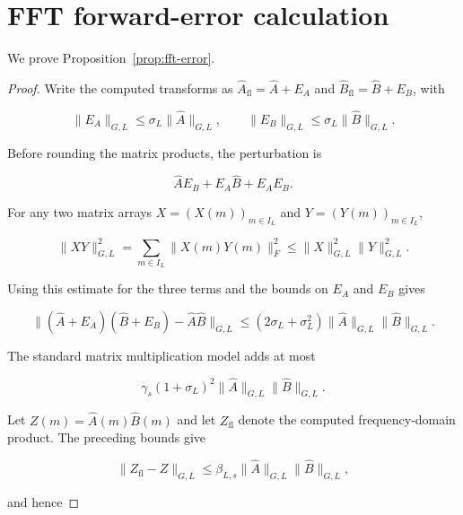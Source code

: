 \documentclass[3p,12pt,authoryear]{elsarticle}
\theoremstyle{definition}
\theoremstyle{remark}
\newcommand{\fl}{\mathrm{fl}}
\begin{document}
\section{FFT forward-error calculation}\label{app:fft-error}

We prove Proposition~\ref{prop:fft-error}.

\begin{proof}
Write the computed transforms as $\widehat A_{\fl}=\widehat A+E_A$ and $\widehat B_{\fl}=\widehat B+E_B$, with

\begin{equation*}
\|E_A\|_{G,L}\leq\sigma_L\|\widehat A\|_{G,L},
\qquad
\|E_B\|_{G,L}\leq\sigma_L\|\widehat B\|_{G,L}.
\end{equation*}

Before rounding the matrix products, the perturbation is

\begin{equation*}
\widehat A E_B+E_A\widehat B+E_AE_B.
\end{equation*}

For any two matrix arrays $X=(X(m))_{m\in I_L}$ and $Y=(Y(m))_{m\in I_L}$,

\begin{equation*}
\|XY\|_{G,L}^2
=
\sum_{m\in I_L}\|X(m)Y(m)\|_F^2
\leq
\|X\|_{G,L}^2\|Y\|_{G,L}^2.
\end{equation*}

Using this estimate for the three terms and the bounds on $E_A$ and $E_B$ gives

\begin{equation*}
\|(\widehat A+E_A)(\widehat B+E_B)-\widehat A\widehat B\|_{G,L}
\leq
(2\sigma_L+\sigma_L^2)\|\widehat A\|_{G,L}\|\widehat B\|_{G,L}.
\end{equation*}

The standard matrix multiplication model adds at most

\begin{equation*}
\gamma_s(1+\sigma_L)^2\|\widehat A\|_{G,L}\|\widehat B\|_{G,L}.
\end{equation*}

Let $Z(m)=\widehat A(m)\widehat B(m)$ and let $Z_{\fl}$ denote the computed frequency-domain product. The preceding bounds give

\begin{equation*}
\|Z_{\fl}-Z\|_{G,L}
\leq
\beta_{L,s}\|\widehat A\|_{G,L}\|\widehat B\|_{G,L},
\end{equation*}

and hence


\end{proof}
\end{document}
